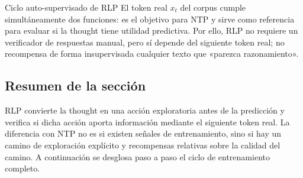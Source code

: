 \begin{importantbox}{Ciclo auto-supervisado de RLP}
El token real $x_t$ del corpus cumple simultáneamente dos funciones: es el objetivo para NTP y sirve como referencia para evaluar si la thought tiene utilidad predictiva. Por ello, RLP no requiere un verificador de respuestas manual, pero sí depende del siguiente token real; no recompensa de forma insupervisada cualquier texto que «parezca razonamiento».
\end{importantbox}

\subsection{Resumen de la sección}

RLP convierte la thought en una acción exploratoria antes de la predicción y verifica si dicha acción aporta información mediante el siguiente token real. La diferencia con NTP no es si existen señales de entrenamiento, sino si hay un camino de exploración explícito y recompensas relativas sobre la calidad del camino. A continuación se desglosa paso a paso el ciclo de entrenamiento completo.
